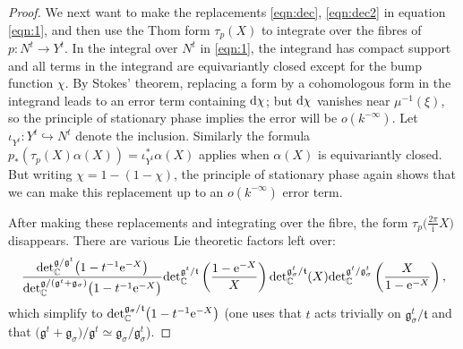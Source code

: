 \documentclass[pdftex]{sigma}
\numberwithin{equation}{section}
\newcommand{\tn}[1]{\textnormal{#1}}
\renewcommand{\i}{{\mathrm{i}}}
\def\g{\ensuremath{\mathfrak{g}}}
\def\t{\ensuremath{\mathfrak{t}}}
\def\bC{\ensuremath{\mathbb{C}}}
\def\de{\ensuremath{\tn{det}_\bC}}
\begin{document}
\begin{proof}
We next want to make the replacements \eqref{eqn:dec}, \eqref{eqn:dec2} in equation \eqref{eqn:1}, and then use the Thom form $\tau_p(X)$ to integrate over the fibres of $p\colon N^t \rightarrow Y^t$. In the integral over $N^t$ in \eqref{eqn:1}, the integrand has compact support and all terms in the integrand are equivariantly closed except for the bump function $\chi$. By Stokes' theorem, replacing a form by a cohomologous form in the integrand leads to an error term containing ${\rm d}\chi$; but ${\rm d}\chi$ vanishes near $\mu^{-1}(\xi)$, so the principle of stationary phase implies the error will be $o(k^{-\infty})$. Let $\iota_{Y^t}\colon Y^t\hookrightarrow N^t$ denote the inclusion. Similarly the formula $p_\ast(\tau_p(X)\alpha(X))=\iota_{Y^t}^\ast \alpha(X)$ applies when $\alpha(X)$ is equivariantly closed. But writing $\chi=1-(1-\chi)$, the principle of stationary phase again shows that we can make this replacement up to an $o(k^{-\infty})$ error term.

After making these replacements and integrating over the fibre, the form $\tau_p\big(\tfrac{2\pi}{\i}X\big)$ disappears. There are various Lie theoretic factors left over:
\[ \frac{\de^{\g/\g^t}\big(1-t^{-1}{\rm e}^{-X}\big)}{\de^{\g/(\g^t+\g_\sigma)}\big(1-t^{-1}{\rm e}^{-X}\big)}\de^{\g^t/\t}\left(\frac{1-{\rm e}^{-X}}{X}\right)\de^{\g_\sigma^t/\t}(X)\de^{\g^t/\g_\sigma^t}\left(\frac{X}{1-{\rm e}^{-X}}\right),\]
which simplify to $\de^{\g_\sigma/\t}\big(1-t^{-1}{\rm e}^{-X}\big)$ (one uses that $t$ acts trivially on $\g_\sigma^t/\t$ and that $\big(\g^t+\g_\sigma\big)/\g^t\simeq \g_\sigma/\g_\sigma^t$).
\end{proof}
\end{document}
